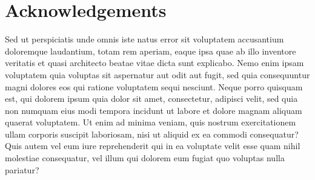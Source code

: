 \chapter*{Acknowledgements}
    Sed ut perspiciatis unde omnis iste natus error sit voluptatem accusantium doloremque
    laudantium, totam rem aperiam, eaque ipsa quae ab illo inventore veritatis et quasi
    architecto beatae vitae dicta sunt explicabo. Nemo enim ipsam voluptatem quia voluptas
    sit aspernatur aut odit aut fugit, sed quia consequuntur magni dolores eos qui ratione
    voluptatem sequi nesciunt. Neque porro quisquam est, qui dolorem ipsum quia dolor sit
    amet, consectetur, adipisci velit, sed quia non numquam eius modi tempora incidunt ut
    labore et dolore magnam aliquam quaerat voluptatem. Ut enim ad minima veniam, quis
    nostrum exercitationem ullam corporis suscipit laboriosam, nisi ut aliquid ex ea commodi
    consequatur? Quis autem vel eum iure reprehenderit qui in ea voluptate velit esse quam nihil
    molestiae consequatur, vel illum qui dolorem eum fugiat quo voluptas nulla pariatur?
